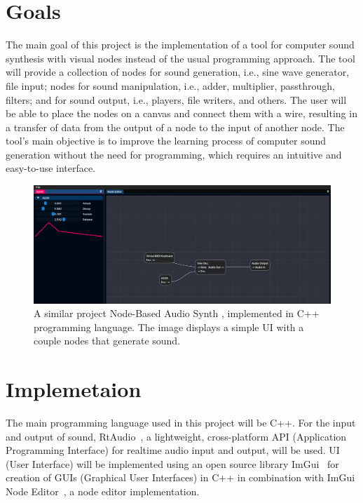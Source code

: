 \documentclass[conference]{IEEEtran}
\begin{document}
\section{Goals}
The main goal of this project is the implementation of a tool for computer sound synthesis with visual nodes instead of the usual programming approach.
The tool will provide a collection of nodes for sound generation, i.e., sine wave generator, file input; nodes for sound manipulation, i.e., adder, multiplier, passthrough, filters; and for sound output, i.e., players, file writers, and others.
The user will be able to place the nodes on a canvas and connect them with a wire, resulting in a transfer of data from the output of a node to the input of another node.
The tool's main objective is to improve the learning process of computer sound generation without the need for programming, which requires an intuitive and easy-to-use interface.
\begin{figure}
\centering
\includegraphics[width=1.0\linewidth]{graphics/example-node-editor.png}
\caption{A similar project Node-Based Audio Synth \cite{nodebasedaudiosynth}, implemented in C++ programming language. The image displays a simple UI with a couple nodes that generate sound.}
\label{fig:example-node-based-audio-synth}
\end{figure}

\section{Implemetaion}
The main programming language used in this project will be C++.
For the input and output of sound, RtAudio~\cite{rtaudio}, a lightweight, cross-platform API (Application Programming Interface) for realtime audio input and output, will be used.
UI (User Interface) will be implemented using an open source library ImGui~\cite{imgui} for creation of GUIs (Graphical User Interfaces) in C++ in combination with ImGui Node Editor~\cite{imguinodeeditor}, a node editor implementation.
\end{document}
